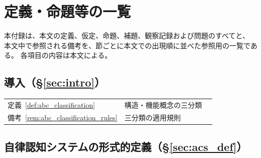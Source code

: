 \section{定義・命題等の一覧}
\label{app:index}

本付録は、本文の定義、仮定、命題、補題、観察記録および問題のすべてと、
本文中で参照される備考を、節ごとに本文での出現順に並べた参照用の一覧である。
各項目の内容は本文による。

\subsection*{導入（\S\ref{sec:intro}）}

\begingroup
\small
\setlength{\tabcolsep}{4pt}
\renewcommand{\arraystretch}{1.12}
\begin{longtable}{p{2.4cm} p{10.4cm} r}
定義~\ref{def:abc_classification} & 構造・機能概念の三分類 & \pageref{def:abc_classification} \\
備考~\ref{rem:abc_classification_rules} & 三分類の適用規則 & \pageref{rem:abc_classification_rules} \\
\end{longtable}
\endgroup

\subsection*{自律認知システムの形式的定義（\S\ref{sec:acs_def}）}

